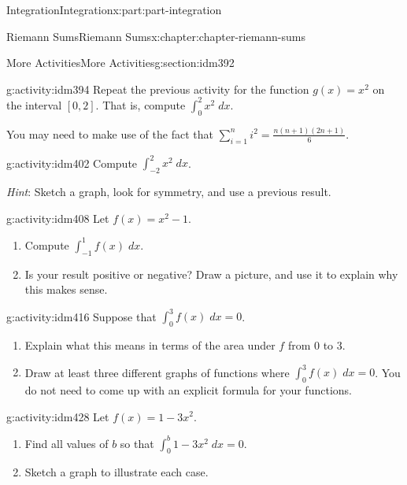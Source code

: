 \documentclass[oneside,10pt,]{book}
\begin{document}
\begin{partptx}{Integration}{}{Integration}{}{}{x:part:part-integration}
\begin{chapterptx}{Riemann Sums}{}{Riemann Sums}{}{}{x:chapter:chapter-riemann-sums}
%
\begin{sectionptx}{More Activities}{}{More Activities}{}{}{g:section:idm392}
\begin{activity}{}{g:activity:idm394}%
Repeat the previous activity for the function \(g(x) = x^2\) on the interval \([0,2]\). That is, compute \(\displaystyle \int_0^2 x^2 \; dx\).%
\par
You may need to make use of the fact that \(\displaystyle\sum_{i=1}^n i^2 = \frac{n(n+1)(2n+1)}{6}\).%
\end{activity}
\begin{activity}{}{g:activity:idm402}%
Compute \(\displaystyle\int_{-2}^2 x^2 \;dx\).%
\par
\emph{Hint}: Sketch a graph, look for symmetry, and use a previous result.%
\end{activity}
\begin{activity}{}{g:activity:idm408}%
Let \(f(x) = x^2 -1 \).%
\begin{enumerate}[font=\bfseries,label=(\alph*),ref=\alph*]
\item{}Compute \(\displaystyle \int_{-1}^1 f(x)\; dx\).\item{}Is your result positive or negative? Draw a picture, and use it to explain why this makes sense.%
\end{enumerate}
\end{activity}
\begin{activity}{}{g:activity:idm416}%
Suppose that \(\displaystyle \int_0^3 f(x)\;dx = 0\).%
\begin{enumerate}[font=\bfseries,label=(\alph*),ref=\alph*]
\item{}Explain what this means in terms of the area under \(f\) from \(0\) to \(3\).%
\item{}Draw at least three different graphs of functions where \(\displaystyle \int_0^3 f(x)\;dx = 0\). You do not need to come up with an explicit formula for your functions.%
\end{enumerate}
\end{activity}
\begin{activity}{}{g:activity:idm428}%
Let \(f(x) = 1-3x^2\).%
\begin{enumerate}[font=\bfseries,label=(\alph*),ref=\alph*]
\item{}Find all values of \(b\) so that \(\displaystyle\int_0^b 1-3x^2\; dx = 0\).%
\item{}Sketch a graph to illustrate each case.%
\end{enumerate}
\end{activity}

\end{sectionptx}
\end{chapterptx}
\end{partptx}
\end{document}
